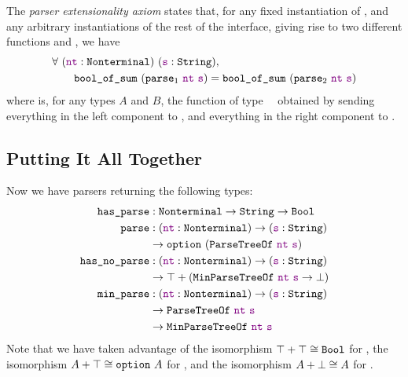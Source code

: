     The \emph{parser extensionality axiom} states that, for any fixed instantiation of , and any arbitrary instantiations of the rest of the interface, giving rise to two different functions  and , we have
    \begin{align*}
      & \forall~(\oftype{\farg{nt}}{\Nonterminal})~(\oftype{\farg{s}}{\String}), \\
      & \qquad\fname{bool\_of\_sum}~(\fname{parse$_1$}~\farg{nt}~\farg{s}) = \fname{bool\_of\_sum}~(\fname{parse$_2$}~\farg{nt}~\farg{s})
    \end{align*}
    where  is, for any types $A$ and $B$, the function of type ~\typeto~\Bool\space obtained by sending everything in the left component to \true, and everything in the right component to \false.

  \subsection{Putting It All Together}
    Now we have parsers returning the following types:
    \begin{align*}
      \fname{has\_parse} & \oftypesep \Nonterminal\typeto\String\typeto\Bool \\
      \fname{parse} & \oftypesep (\oftype{\farg{nt}}{\Nonterminal}) \typeto (\oftype{\farg{s}}{\String}) \\
      & \typeto \typeoptionp{\indname{ParseTreeOf}~\farg{nt}~\farg{s}} \\
      \fname{has\_no\_parse} & \oftypesep (\oftype{\farg{nt}}{\Nonterminal}) \typeto (\oftype{\farg{s}}{\String}) \\
      &  \typeto \typesum{\Unit}{\left(\indname{MinParseTreeOf}~\farg{nt}~\farg{s} \typeto \False\right)} \\
      \fname{min\_parse} & \oftypesep (\oftype{\farg{nt}}{\Nonterminal}) \typeto (\oftype{\farg{s}}{\String}) \\
      & \typeto \indname{ParseTreeOf}~\farg{nt}~\farg{s} \\
      & \typeto\indname{MinParseTreeOf}~\farg{nt}~\farg{s}
    \end{align*}
    Note that we have taken advantage of the isomorphism $\typesum{\Unit}{\Unit} \cong \Bool$ for , the isomorphism $\typesum{A}{\Unit} \cong \typeoption[~]{A}$ for , and the isomorphism $\typesum{A}{\False} \cong A$ for .


